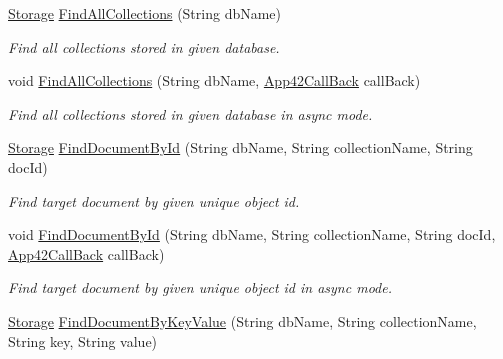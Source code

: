 \begin{DoxyCompactItemize}
\hyperlink{classcom_1_1shephertz_1_1app42_1_1paas_1_1sdk_1_1csharp_1_1storage_1_1_storage}{Storage} \hyperlink{classcom_1_1shephertz_1_1app42_1_1paas_1_1sdk_1_1csharp_1_1storage_1_1_storage_service_a58f5e3b5e60a58ca9f9ad477462f613f}{Find\+All\+Collections} (String db\+Name)
\begin{DoxyCompactList}\small\item\em Find all collections stored in given database. \end{DoxyCompactList}\item 
void \hyperlink{classcom_1_1shephertz_1_1app42_1_1paas_1_1sdk_1_1csharp_1_1storage_1_1_storage_service_ae327db258934c13a853704b46c0bdfb9}{Find\+All\+Collections} (String db\+Name, \hyperlink{interfacecom_1_1shephertz_1_1app42_1_1paas_1_1sdk_1_1csharp_1_1_app42_call_back}{App42\+Call\+Back} call\+Back)
\begin{DoxyCompactList}\small\item\em Find all collections stored in given database in async mode. \end{DoxyCompactList}\item 
\hyperlink{classcom_1_1shephertz_1_1app42_1_1paas_1_1sdk_1_1csharp_1_1storage_1_1_storage}{Storage} \hyperlink{classcom_1_1shephertz_1_1app42_1_1paas_1_1sdk_1_1csharp_1_1storage_1_1_storage_service_ab06e1b72631abfe2e383852e811e7931}{Find\+Document\+By\+Id} (String db\+Name, String collection\+Name, String doc\+Id)
\begin{DoxyCompactList}\small\item\em Find target document by given unique object id. \end{DoxyCompactList}\item 
void \hyperlink{classcom_1_1shephertz_1_1app42_1_1paas_1_1sdk_1_1csharp_1_1storage_1_1_storage_service_af152ea2c1ac17c561d8b9a8eb651e7f4}{Find\+Document\+By\+Id} (String db\+Name, String collection\+Name, String doc\+Id, \hyperlink{interfacecom_1_1shephertz_1_1app42_1_1paas_1_1sdk_1_1csharp_1_1_app42_call_back}{App42\+Call\+Back} call\+Back)
\begin{DoxyCompactList}\small\item\em Find target document by given unique object id in async mode. \end{DoxyCompactList}\item 
\hyperlink{classcom_1_1shephertz_1_1app42_1_1paas_1_1sdk_1_1csharp_1_1storage_1_1_storage}{Storage} \hyperlink{classcom_1_1shephertz_1_1app42_1_1paas_1_1sdk_1_1csharp_1_1storage_1_1_storage_service_ab3b8b5292ae73df310965011ee4e9bbf}{Find\+Document\+By\+Key\+Value} (String db\+Name, String collection\+Name, String key, String value)

\end{DoxyCompactItemize}
